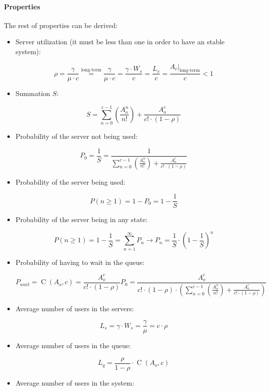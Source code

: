 \documentclass[../main.tex]{subfiles}
\begin{document}
\paragraph{Properties}

The rest of properties can be derived:

\begin{itemize}
	\item {
		Server utilization (it must be less than one in order to have an stable system):

		$$
			\rho =
			\frac {\gamma} {\mu \cdot c} \overset {\textrm{long-term}} {=}
			\frac {\gamma} {\mu \cdot c} =
			\frac {\gamma \cdot W_s} {c} =
			\frac {L_s} {c} =
			\frac {\left. A_c \right|_{\textrm{long-term}}} {c}
			< 1
		$$
	}
	\item {
		Summation $S$:

		$$
			S =
			\sum_{n=0}^{c-1} \left( \frac {A_{o}^n} {n!} \right) + \frac {A_{o}^c} {c! \cdot (1-\rho)}
		$$
	}
	\item {
		Probability of the server not being used:

		$$
			P_0 = \frac {1} {S} = \frac {1} {\sum_{n=0}^{c-1} \left( \frac {A_{o}^n} {n!} \right) + \frac {A_{o}^c} {c! \cdot (1-\rho)}}
		$$
	}
	\item {
		Probability of the server being used:

		$$
			P(n \geq 1) = 1 - P_0 = 1 - \frac {1} {S}
		$$
	}
	\item {
		Probability of the server being in any state:

		$$
			P(n \geq 1) = 1 - \frac {1} {S} = \sum_{n=1}^{\infty} P_n \rightarrow
			P_n = \frac {1} {S} \cdot \left( 1 - \frac {1} {S} \right)^n
		$$
	}
	\item {
		Probability of having to wait in the queue:

		$$
			P_{wait} = \operatorname{C}(A_o, c) = \frac {A_{o}^c} {c! \cdot (1-\rho)} P_0 =  \frac {A_{o}^c} { c! \cdot (1-\rho) \cdot \left( \sum_{n=0}^{c-1} \left( \frac {A_{o}^n} {n!} \right) + \frac {A_{o}^c} {c! \cdot (1-\rho)} \right) }
		$$
	}
	\item {
		Average number of users in the servers:

		$$
			L_s = \gamma \cdot W_s = \frac {\gamma} {\mu} = c \cdot \rho
		$$
	}
	\item {
		Average number of users in the queue:

		$$
			L_q = \frac {\rho} {1-\rho} \cdot \operatorname{C}(A_o, c)
		$$
	}
	\item {
		Average number of users in the system:

}
\end{itemize}
\end{document}
